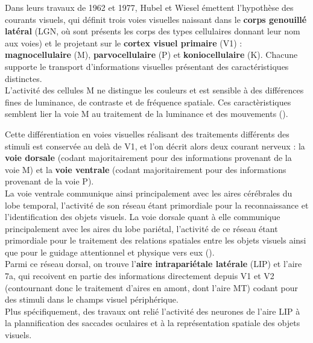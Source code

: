 Dans leurs travaux de 1962 et 1977, Hubel et Wiesel émettent l'hypothèse des courants visuels, qui définit trois voies visuelles naissant dans le \textbf{corps genouillé latéral} (LGN, où sont présents les corps des types cellulaires donnant leur nom aux voies) et le projetant sur le \textbf{cortex visuel primaire} (V1) :  \textbf{magnocellulaire} (M),  \textbf{parvocellulaire} (P) et  \textbf{koniocellulaire} (K). Chacune supporte le transport d'informations visuelles présentant des caractéristiques distinctes.\\
L'activité des cellules M ne distingue les couleurs et est sensible à des différences fines de luminance, de contraste et de fréquence spatiale. Ces caractèristiques semblent lier la voie M au traitement de la luminance et des mouvements (\cite{Werner2014}).

Cette différentiation en voies visuelles réalisant des traitements différents des stimuli est conservée au delà de V1, et l'on décrit alors deux courant nerveux :  la \textbf{voie dorsale} (codant majoritairement pour des informations provenant de la voie M) et  la \textbf{voie ventrale} (codant majoritairement pour des informations provenant de la voie P).\\
La voie ventrale communique ainsi principalement avec les aires cérébrales du lobe temporal, l'activité de son réseau étant primordiale pour la reconnaissance et l'identification des objets visuels. La voie dorsale quant à elle communique principalement avec les aires du lobe pariétal, l'activité de ce réseau étant primordiale pour le traitement des relations spatiales entre les objets visuels ainsi que pour le guidage attentionnel et physique vers eux (\cite{Werner2014}).\\
Parmi ce réseau dorsal, on trouve l'\textbf{aire intrapariétale latérale} (LIP) et l'aire 7a, qui recoivent en partie des informations directement depuis V1 et V2 (contournant donc le traitement d'aires en amont, dont l'aire MT) codant pour des stimuli dans le champs visuel périphérique.\\
Plus spécifiquement, des travaux ont relié l'activité des neurones de l'aire LIP à la plannification des saccades oculaires et à la représentation spatiale des objets visuels.



